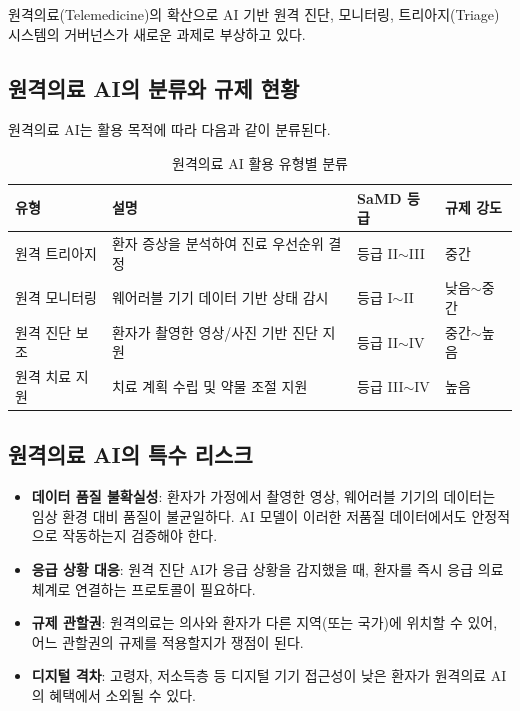 원격의료(Telemedicine)의 확산으로 AI 기반 원격 진단, 모니터링, 트리아지(Triage) 시스템의 거버넌스가 새로운 과제로 부상하고 있다.

\subsection{원격의료 AI의 분류와 규제 현황}

원격의료 AI는 활용 목적에 따라 다음과 같이 분류된다.

\begin{table}[htbp]
\centering
\caption{원격의료 AI 활용 유형별 분류}
\label{tab:16_telemedicine}
\begin{tabularx}{\textwidth}{p{2.5cm}Xp{2.5cm}p{2cm}}
\toprule
\textbf{유형} & \textbf{설명} & \textbf{SaMD 등급} & \textbf{규제 강도} \\
\midrule
원격 트리아지 & 환자 증상을 분석하여 진료 우선순위 결정 & 등급 II$\sim$III & 중간 \\
원격 모니터링 & 웨어러블 기기 데이터 기반 상태 감시 & 등급 I$\sim$II & 낮음$\sim$중간 \\
원격 진단 보조 & 환자가 촬영한 영상/사진 기반 진단 지원 & 등급 II$\sim$IV & 중간$\sim$높음 \\
원격 치료 지원 & 치료 계획 수립 및 약물 조절 지원 & 등급 III$\sim$IV & 높음 \\
\bottomrule
\end{tabularx}
\end{table}

\subsection{원격의료 AI의 특수 리스크}

\begin{itemize}
 \item \textbf{데이터 품질 불확실성}: 환자가 가정에서 촬영한 영상, 웨어러블 기기의 데이터는 임상 환경 대비 품질이 불균일하다. AI 모델이 이러한 저품질 데이터에서도 안정적으로 작동하는지 검증해야 한다.
 \item \textbf{응급 상황 대응}: 원격 진단 AI가 응급 상황을 감지했을 때, 환자를 즉시 응급 의료 체계로 연결하는 프로토콜이 필요하다.
 \item \textbf{규제 관할권}: 원격의료는 의사와 환자가 다른 지역(또는 국가)에 위치할 수 있어, 어느 관할권의 규제를 적용할지가 쟁점이 된다.
 \item \textbf{디지털 격차}: 고령자, 저소득층 등 디지털 기기 접근성이 낮은 환자가 원격의료 AI의 혜택에서 소외될 수 있다.
\end{itemize}

